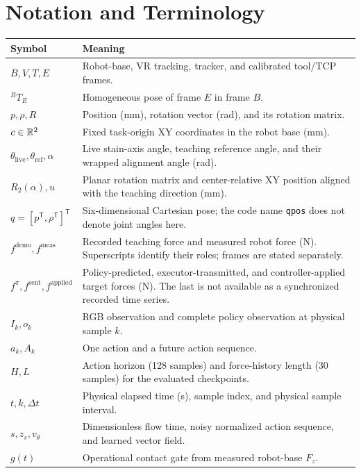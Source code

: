 \chapter*{Notation and Terminology}
\begin{longtable}{P{0.23\textwidth}p{0.69\textwidth}}
\toprule Symbol & Meaning \\ \midrule
\endhead
\(B,V,T,E\) & Robot-base, VR tracking, tracker, and calibrated tool/TCP frames. \\
\({}^{B}T_E\) & Homogeneous pose of frame \(E\) in frame \(B\). \\
\(p,\rho,R\) & Position (mm), rotation vector (rad), and its rotation matrix. \\
\(c\in\mathbb{R}^2\) & Fixed task-origin XY coordinates in the robot base (mm). \\
\(\theta_{\mathrm{live}},\theta_{\mathrm{ref}},\alpha\) & Live stain-axis angle, teaching reference angle, and their wrapped alignment angle (rad). \\
\(R_2(\alpha),u\) & Planar rotation matrix and center-relative XY position aligned with the teaching direction (mm). \\
\(q=[p^\mathsf{T},\rho^\mathsf{T}]^\mathsf{T}\) & Six-dimensional Cartesian pose; the code name \texttt{qpos} does not denote joint angles here. \\
\(f^{\mathrm{demo}},f^{\mathrm{meas}}\) & Recorded teaching force and measured robot force (N). Superscripts identify their roles; frames are stated separately. \\
\(f^{\pi},f^{\mathrm{sent}},f^{\mathrm{applied}}\) & Policy-predicted, executor-transmitted, and controller-applied target forces (N). The last is not available as a synchronized recorded time series. \\
\(I_k,o_k\) & RGB observation and complete policy observation at physical sample \(k\). \\
\(a_k,A_k\) & One action and a future action sequence. \\
\(H,L\) & Action horizon (128 samples) and force-history length (30 samples) for the evaluated checkpoints. \\
\(t,k,\Delta t\) & Physical elapsed time (s), sample index, and physical sample interval. \\
\(s,z_s,v_\theta\) & Dimensionless flow time, noisy normalized action sequence, and learned vector field. \\
\(g(t)\) & Operational contact gate from measured robot-base \(F_z\). \\

\end{longtable}
